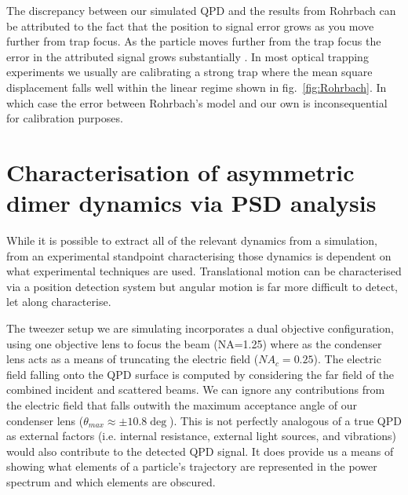 The discrepancy between our simulated QPD and the results 
from Rohrbach can be attributed to the fact that the position 
to signal error grows as you move further from trap focus. 
As the particle moves further from the trap focus the error 
in the attributed signal grows substantially \cite{Rohrbach2002}.
In most optical trapping experiments we usually are calibrating 
a strong trap where the mean square displacement falls well within 
the linear regime shown in fig.~\ref{fig:Rohrbach}. In which case 
the error between Rohrbach's model and our own is inconsequential 
for calibration purposes. 

\section{Characterisation of asymmetric dimer dynamics via PSD analysis}
\label{sec:PSD_analysis}
While it is possible to extract all of the relevant dynamics from a simulation, from an experimental standpoint characterising those 
dynamics is dependent on what experimental techniques are used. 
Translational motion can be characterised via a position detection 
system but angular motion is far more difficult to detect, let along characterise. 

The tweezer setup we are simulating incorporates a dual objective 
configuration, using one objective lens to focus the beam (NA=1.25)
where as the condenser lens acts as a means of truncating the electric
field ($NA_c=0.25$). The electric field falling onto the QPD surface is computed by considering the far field of the combined incident and 
scattered beams. We can ignore any contributions from the electric
field that falls outwith the maximum acceptance angle of our condenser
lens ($\theta_{max}\approx\pm10.8\deg$). This is not perfectly analogous
of a true QPD as external factors (i.e. internal resistance, external
light sources, and vibrations) would also contribute to the detected QPD 
signal. It does provide us a means of showing what elements of a particle's
trajectory are represented in the power spectrum and which elements are 
obscured.

